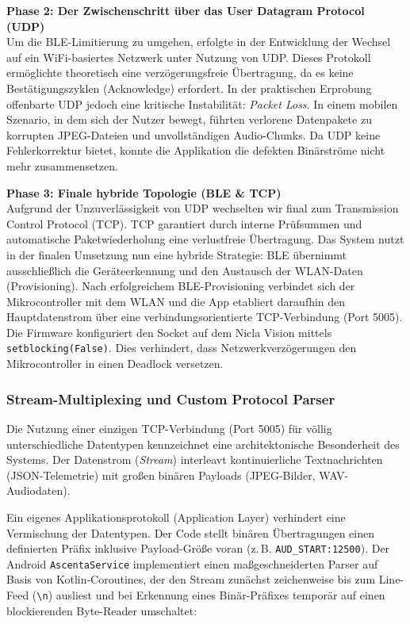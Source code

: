 \vspace{1em}
\noindent\textbf{Phase 2: Der Zwischenschritt über das User Datagram Protocol (UDP)} \\
Um die BLE-Limitierung zu umgehen, erfolgte in der Entwicklung der Wechsel auf ein WiFi-basiertes Netzwerk unter Nutzung von UDP. Dieses Protokoll ermöglichte theoretisch eine verzögerungsfreie Übertragung, da es keine Bestätigungszyklen (Acknowledge) erfordert. In der praktischen Erprobung offenbarte UDP jedoch eine kritische Instabilität: \textit{Packet Loss}. In einem mobilen Szenario, in dem sich der Nutzer bewegt, führten verlorene Datenpakete zu korrupten JPEG-Dateien und unvollständigen Audio-Chunks. Da UDP keine Fehlerkorrektur bietet, konnte die Applikation die defekten Binärströme nicht mehr zusammensetzen.

\vspace{1em}
\noindent\textbf{Phase 3: Finale hybride Topologie (BLE \& TCP)} \\
Aufgrund der Unzuverlässigkeit von UDP wechselten wir final zum Transmission Control Protocol (TCP). TCP garantiert durch interne Prüfsummen und automatische Paketwiederholung eine verlustfreie Übertragung. Das System nutzt in der finalen Umsetzung nun eine hybride Strategie: BLE übernimmt ausschließlich die Geräteerkennung und den Austausch der WLAN-Daten (Provisioning). Nach erfolgreichem BLE-Provisioning verbindet sich der Mikrocontroller mit dem WLAN und die App etabliert daraufhin den Hauptdatenstrom über eine verbindungsorientierte TCP-Verbindung (Port 5005). Die Firmware konfiguriert den Socket auf dem Nicla Vision mittels \texttt{setblocking(False)}. Dies verhindert, dass Netzwerkverzögerungen den Mikrocontroller in einen Deadlock versetzen.

\subsubsection*{Stream-Multiplexing und Custom Protocol Parser}
Die Nutzung einer einzigen TCP-Verbindung (Port 5005) für völlig unterschiedliche Datentypen kennzeichnet eine architektonische Besonderheit des Systems. Der Datenstrom (\textit{Stream}) interleavt kontinuierliche Textnachrichten (JSON-Telemetrie) mit großen binären Payloads (JPEG-Bilder, WAV-Audiodaten). 

Ein eigenes Applikationsprotokoll (Application Layer) verhindert eine Vermischung der Datentypen. Der Code stellt binären Übertragungen einen definierten Präfix inklusive Payload-Größe voran (z.\,B. \texttt{AUD\_START:12500}). Der Android \texttt{AscentaService} implementiert einen maßgeschneiderten Parser auf Basis von Kotlin-Coroutines, der den Stream zunächst zeichenweise bis zum Line-Feed (\texttt{\textbackslash n}) ausliest und bei Erkennung eines Binär-Präfixes temporär auf einen blockierenden Byte-Reader umschaltet:

